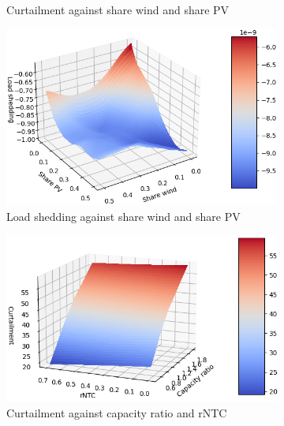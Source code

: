 \begin{figure}[h]
\begin{subfigure}[b]{0.49\textwidth}
        \caption{Curtailment against share wind and share PV}
        \label{fig:surf-3-4-0}
    \end{subfigure}
    \hfill
    \begin{subfigure}[b]{0.49\textwidth}
        \includegraphics[width=\textwidth]{resources/images/view_3-4-1.png}
        \caption{Load shedding against share wind and share PV}
        \label{fig:surf-3-4-1}
    \end{subfigure}
    \hfill
    \begin{subfigure}[b]{0.49\textwidth}
        \includegraphics[width=\textwidth]{resources/images/view_0-5-0.png}
        \caption{Curtailment against capacity ratio and rNTC}
        \label{fig:surf-0-5-0}
    \end{subfigure}
    \hfill
    \begin{subfigure}[b]{0.49\textwidth}

\end{subfigure}
\end{figure}
